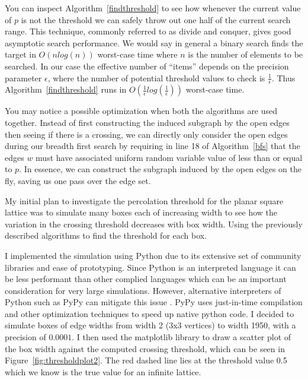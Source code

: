 \documentclass[a4paper,11pt]{article}
\theoremstyle{definition}
\begin{document}
You can inspect Algorithm~\ref*{findthreshold} to see how whenever the current value of $p$ is not the threshold we can safely throw out one half of the current search range. This technique, commonly referred to as divide and conquer, gives good asymptotic search performance. We would say in general a binary search finds the target in $O(nlog(n))$ worst-case time where $n$ is the number of elements to be searched. In our case the effective number of ``items'' depends on the precision parameter $\epsilon$, where the number of potential threshold values to check is $\frac{1}{\epsilon}$. Thus Algorithm~\ref*{findthreshold} runs in $O(\frac{1}{\epsilon}log(\frac{1}{\epsilon}))$ worst-case time.

You may notice a possible optimization when both the algorithms are used together. Instead of first constructing the induced subgraph by the open edges then seeing if there is a crossing, we can directly only consider the open edges during our breadth first search by requiring in line 18 of Algorithm~\ref*{bfs} that the edges $w$ must have associated uniform random variable value of less than or equal to $p$. In essence, we can construct the subgraph induced by the open edges on the fly, saving us one pass over the edge set. 

My initial plan to investigate the percolation threshold for the planar square lattice was to simulate many boxes each of increasing width to see how the variation in the crossing threshold decreases with box width. Using the previously described algorithms to find the threshold for each box.

I implemented the simulation using Python due to its extensive set of community libraries and ease of prototyping. Since Python is an interpreted language it can be less performant than other complied languages which can be an important consideration for very large simulations. However, alternative interpreters  of Python such as PyPy can mitigate this issue \cite{PyPy}. PyPy uses just-in-time compilation and other optimization techniques to speed up native python code.
I decided to simulate boxes of edge widths from width 2 (3x3 vertices) to width 1950, with a precision of $0.0001$. I then used the matplotlib library to draw a scatter plot of the box width against the computed crossing threshold, which can be seen in Figure~\ref*{fig:thresholdplot2}. The red dashed line lies at the threshold value 0.5 which we know is the true value for an infinite lattice.
\end{document}
